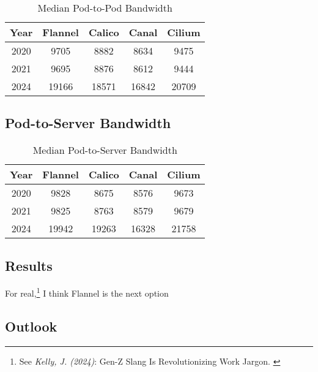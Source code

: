 \begin{table}[H]
\caption{Median Pod-to-Pod Bandwidth}
\begin{tabular}{|c | c | c | c | c|} 
 \hline
 Year & Flannel & Calico & Canal & Cilium \\
 \hline\hline
 2020 & 9705 & 8882 & 8634 & 9475 \\ 
 \hline
 2021 & 9695 & 8876 & 8612 & 9444 \\
 \hline
 2024 & 19166 & 18571 & 16842 & 20709 \\
 \hline
\end{tabular}
\label{tab:p2pbw}
\end{table}

\subsection{Pod-to-Server Bandwidth}

\begin{table}[H]
\caption{Median Pod-to-Server Bandwidth}
\begin{tabular}{|c | c | c | c | c|} 
 \hline
 Year & Flannel & Calico & Canal & Cilium \\
 \hline\hline
 2020 & 9828 & 8675 & 8576 & 9673 \\ 
 \hline
 2021 & 9825 & 8763 & 8579 & 9679 \\
 \hline
 2024 & 19942 & 19263 & 16328 & 21758 \\
 \hline
\end{tabular}
\label{tab:p2ebw}
\end{table}

\subsection{Results}

For real,\footnote{See \textit{Kelly, J. (2024)}: Gen-Z Slang Is Revolutionizing Work Jargon. \cite{genzSlang}} I think Flannel is the next option

\subsection{Outlook}
